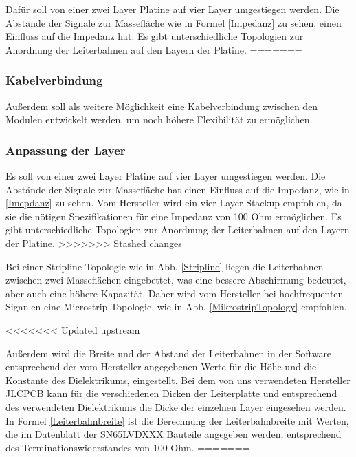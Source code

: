 Dafür soll von einer zwei Layer Platine auf vier Layer umgestiegen werden. Die Abstände der Signale zur Massefläche wie in Formel \ref{Impedanz} zu sehen, einen Einfluss auf die Impedanz hat. Es gibt unterschiedliche Topologien zur Anordnung der Leiterbahnen auf den Layern der Platine.
=======
\subsubsection{Kabelverbindung}
Außerdem soll als weitere Möglichkeit eine Kabelverbindung zwischen den Modulen entwickelt werden, um noch höhere Flexibilität zu ermöglichen.

\subsubsection{Anpassung der Layer}
Es soll von einer zwei Layer Platine auf vier Layer umgestiegen werden. Die Abstände der Signale zur Massefläche hat einen Einfluss auf die Impedanz, wie in \ref{Imepdanz} zu sehen. Vom Hersteller wird ein vier Layer Stackup empfohlen, da sie die nötigen Spezifikationen für eine Impedanz von 100 Ohm ermöglichen. Es gibt unterschiedliche Topologien zur Anordnung der Leiterbahnen auf den Layern der Platine.
>>>>>>> Stashed changes

 
Bei einer Stripline-Topologie wie in Abb. \ref{Stripline} liegen die Leiterbahnen zwischen zwei Masseflächen eingebettet, was eine bessere Abschirmung bedeutet, aber auch eine höhere Kapazität. Daher wird vom Hersteller bei hochfrequenten Siganlen eine Microstrip-Topologie, wie in Abb. \ref{MikrostripTopology} empfohlen. 


<<<<<<< Updated upstream

Außerdem wird die Breite und der Abstand der Leiterbahnen in der Software entsprechend der vom Hersteller angegebenen Werte für die Höhe und die Konstante des Dielektrikums, eingestellt. Bei dem von uns verwendeten Hersteller JLCPCB kann für die verschiedenen Dicken der Leiterplatte und entsprechend des verwendeten Dielektrikums die Dicke der einzelnen Layer eingesehen werden.  
In Formel \ref{Leiterbahnbreite} ist die Berechnung der Leiterbahnbreite mit Werten, die im Datenblatt der SN65LVDXXX Bauteile angegeben werden, entsprechend des Terminationswiderstandes von 100 Ohm.
=======
